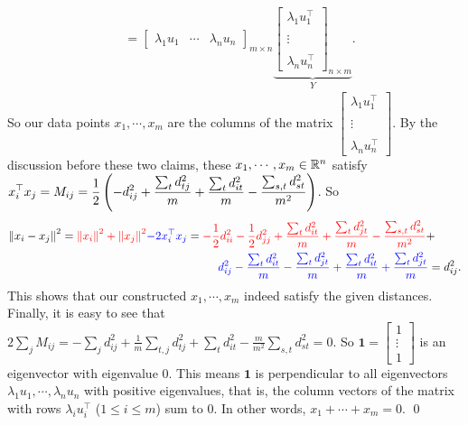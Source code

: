 \begin{enumerate}[leftmargin=*]
\begin{pf}
\begin{align*}
&=\begin{bmatrix}\lambda_{1}u_{1}&\cdots&\lambda_{n}u_{n}\end{bmatrix}_{m\times n}\underbrace{\begin{bmatrix}\lambda_{1}u_{1}^{\top}\\\\\vdots\\\\\lambda_{n}u_{n}^{\top}\end{bmatrix}_{n\times m}}_{Y}.
\end{align*}
So our data points $x_{1},\cdots,x_{m}$ are the columns of the matrix $\begin{bmatrix}\lambda_{1}u_{1}^{\top}\\\\\vdots\\\\\lambda_{n}u_{n}^{\top}\end{bmatrix}$. By the discussion before these two claims, these $x_{1},\cdots,x_{m}\in\mathbb{R}^{n}$ satisfy $\displaystyle x_{i}^{\top}x_{j} = M_{ij} = \frac{1}{2}\left(-d_{ij}^{2} + \frac{\sum_{t}d_{tj}^{2}}{m} + \frac{\sum_{t}d_{it}^{2}}{m} - \frac{\sum_{s,t}d_{st}^{2}}{m^{2}}\right)$. So 
\begin{align*}
\left\lVert x_{i}-x_{j} \right\rVert_{}^{2} = {\color{red}\left\lVert x_{i} \right\rVert_{}^{2} + \left\lVert x_{j} \right\rVert_{}^{2}} {\color{blue}- 2x_{i}^{\top}x_{j}}
&= {\color{red}-\frac{1}{2}d_{ii}^{2} - \frac{1}{2}d_{jj}^{2} + \frac{\sum_{t}d_{it}^{2}}{m} + \frac{\sum_{t}d_{jt}^{2}}{m} - \frac{\sum_{s,t}d_{st}^{2}}{m^{2}}} + \\&~~~~~~~~{\color{blue}d_{ij}^{2} - \frac{\sum_{t}d_{it}^{2}}{m}-\frac{\sum_{t}d_{jt}^{2}}{m}  + \frac{\sum_{t}d_{it}^{2}}{m} + \frac{\sum_{t}d_{jt}^{2}}{m}}= d_{ij}^{2}.
\end{align*}
This shows that our constructed $x_{1},\cdots,x_{m}$ indeed satisfy the given distances.
Finally, it is easy to see that $2\sum_{j}M_{ij} = -\sum_{j}d_{ij}^{2} + \frac{1}{m}\sum_{t,j}d_{tj}^{2} + \sum_{t}d_{it}^{2} - \frac{m}{m^{2}}\sum_{s,t}d_{st}^{2} = 0$. So $\pmb 1 = \begin{bmatrix}1\\\vdots\\1\end{bmatrix}$ is an eigenvector with eigenvalue $0$. This means $\pmb 1$ is perpendicular to all eigenvectors $\lambda_{1} u_{1}, \cdots, \lambda_{n} u_{n}$ with positive eigenvalues, that is, the column vectors of the matrix with rows $\lambda_{i} u_{i}^{\top}$ ($1\le i\le m$) sum to $0$. In other words, $x_{1}+\cdots+x_{m}=0$.
\qed\end{pf}



\end{enumerate}
